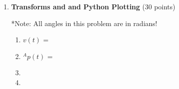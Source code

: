 \documentclass{article}
\begin{document}
\begin{enumerate}
\begin{enumerate}
    \item


    \item


\end{enumerate}





\item \textbf{Transforms and and Python Plotting} (30 points)




*Note: All angles in this problem are in radians!

\begin{enumerate}

    \item 
    $v(t)$ = 
    
    
    
    \item 
    $^Ap(t)$ = 
    
    \item 
    
    
    \item 
    

\end{enumerate}


\end{enumerate}
\end{document}
